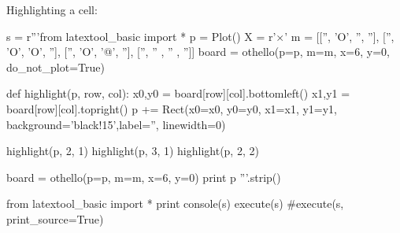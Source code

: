 \newpage
Highlighting a cell:

\begin{python}
s = r'''from latextool_basic import *
p = Plot()
X = r'$\times$'
m = [['', 'O', '',  ''],
     ['', 'O', 'O', ''],
     ['', 'O', '@', ''],
     ['', '' , '' , '']]
board = othello(p=p, m=m, x=6, y=0, do_not_plot=True)

def highlight(p, row, col):
    x0,y0 = board[row][col].bottomleft()
    x1,y1 = board[row][col].topright()
    p += Rect(x0=x0, y0=y0, x1=x1, y1=y1,
         background='black!15',label='', linewidth=0)

highlight(p, 2, 1)
highlight(p, 3, 1)
highlight(p, 2, 2)

board = othello(p=p, m=m, x=6, y=0)
print p
'''.strip()

from latextool_basic import *
print console(s)
execute(s)
#execute(s, print_source=True)
\end{python}

